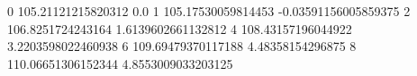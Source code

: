 0 105.21121215820312 0.0
1 105.17530059814453 -0.03591156005859375
2 106.8251724243164 1.6139602661132812
4 108.43157196044922 3.2203598022460938
6 109.69479370117188 4.48358154296875
8 110.06651306152344 4.8553009033203125
